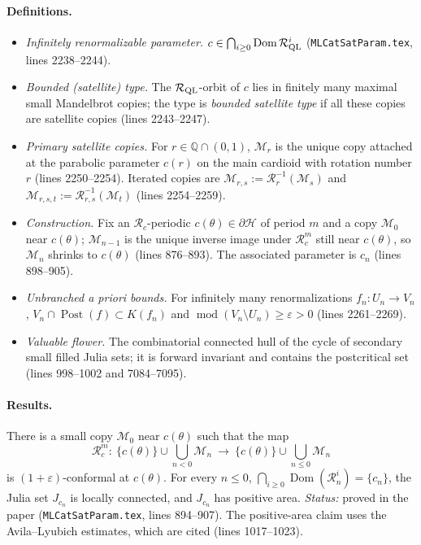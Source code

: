 \paragraph{Definitions.}
\begin{itemize}
\item \emph{Infinitely renormalizable parameter.}  $c\in\bigcap_{i\ge0}\operatorname{Dom}\mathcal R_{\rm QL}^i$
(\texttt{MLCatSatParam.tex}, lines 2238--2244).
\item \emph{Bounded (satellite) type.}  The $\mathcal R_{\rm QL}$-orbit of $c$ lies in finitely many maximal
small Mandelbrot copies; the type is \emph{bounded satellite type} if all these copies are satellite copies
(lines 2243--2247).
\item \emph{Primary satellite copies.}  For $r\in\mathbb Q\cap(0,1)$, $\mathcal M_r$ is the unique copy attached at
the parabolic parameter $c(r)$ on the main cardioid with rotation number $r$ (lines 2250--2254).  Iterated copies
are $\mathcal M_{r,s}:=\mathcal R_r^{-1}(\mathcal M_s)$ and $\mathcal M_{r,s,t}:=\mathcal R_{r,s}^{-1}(\mathcal M_t)$
(lines 2254--2259).
\item \emph{Construction.}  Fix an $\mathcal R_c$-periodic $c(\theta)\in\partial\mathcal H$ of period $m$ and a copy
$\mathcal M_0$ near $c(\theta)$; $\mathcal M_{n-1}$ is the unique inverse image under $\mathcal R_c^m$ still near
$c(\theta)$, so $\mathcal M_n$ shrinks to $c(\theta)$ (lines 876--893).  The associated parameter is $c_n$
(lines 898--905).
\item \emph{Unbranched a priori bounds.}  For infinitely many renormalizations $f_n\colon U_n\to V_n$,
$V_n\cap\operatorname{Post}(f)\subset K(f_n)$ and $\operatorname{mod}(V_n\setminus U_n)\ge\varepsilon>0$
(lines 2261--2269).
\item \emph{Valuable flower.}  The combinatorial connected hull of the cycle of secondary small filled Julia sets;
it is forward invariant and contains the postcritical set (lines 998--1002 and 7084--7095).
\end{itemize}

\paragraph{Results.}

\begin{theorem}
\label{thm:dl-sat-main}
There is a small copy $\mathcal M_0$ near $c(\theta)$ such that the map
\[
\mathcal R_c^m\colon\ \{c(\theta)\}\cup\bigcup_{n<0}\mathcal M_n\ \longrightarrow\
\{c(\theta)\}\cup\bigcup_{n\le0}\mathcal M_n
\]
is $(1+\varepsilon)$-conformal at $c(\theta)$.  For every $n\le0$, $\bigcap_{i\ge0}\operatorname{Dom}(\mathcal R_n^i)=\{c_n\}$,
the Julia set $J_{c_n}$ is locally connected, and $J_{c_n}$ has positive area.
\emph{Status:} proved in the paper (\texttt{MLCatSatParam.tex}, lines 894--907).  The positive-area claim
uses the Avila--Lyubich estimates, which are cited (lines 1017--1023).
\end{theorem}

